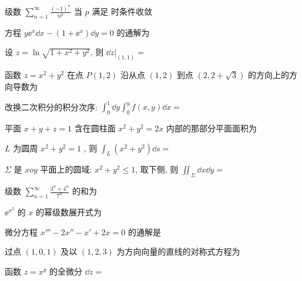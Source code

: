 \begin{ti}
	级数 $\sum_{n=1}^{\infty} \frac{(-1)^{n}}{n^{p}}$ 当 $p$ 满足 \hua{}时条件收敛
\end{ti}

\begin{ti}
	方程 $y \ee^{x} \dd{x}-\left(1+\ee^{x}\right) \dd{y}=0$ 的通解为 \hua{}
\end{ti}

\begin{ti}
	设 $z=\ln \sqrt{1+x^{2}+y^{2}}$, 则 $\dd\left.z\right|_{(1,1)}=$ \hua{}
\end{ti}

\begin{ti}
	函数 $z=x^{2}+y^{2}$ 在点 $P(1,2)$ 沿从点 $(1,2)$ 到点 $(2,2+\sqrt{3})$ 的方向上的方向导数为 \hua{}
\end{ti}

\begin{ti}
	改换二次积分的积分次序: $\int_{0}^{1} \dd{y} \int_{0}^{y} f(x, y) \dd{x}=$ \hua{}
\end{ti}

\begin{ti}
	平面 $x+y+z=1$ 含在圆柱面 $x^{2}+y^{2}=2 x$ 内部的那部分平面面积为 \hua{}
\end{ti}

\begin{ti}
	$L$ 为圆周 $x^{2}+y^{2}=1$ , 则 $\int_{L}\left(x^{2}+y^{2}\right) \dd{s}=$ \hua{}
\end{ti}

\begin{ti}
	$\Sigma$ 是 $xoy$ 平面上的圆域: $x^{2}+y^{2} \leqslant 1$, 取下侧, 则 $\iint_{\Sigma} \dd{x} \dd{y}=$ \hua{}
\end{ti}

\begin{ti}
	级数 $\sum_{n=1}^{\infty} \frac{3^{n}+4^{n}}{7^{n}}$ 的和为 \hua{}
\end{ti}

\begin{ti}
	$\ee^{x^{2}}$ 的 $x$ 的幂级数展开式为 \hua{}
\end{ti}

\begin{ti}
	微分方程 $x'''-2x''-x'+2x=0$ 的通解是 \hua{}
\end{ti}

\begin{ti}
	过点 $(1,0,1)$ 及以 $(1,2,3)$ 为方向向量的直线的对称式方程为 \hua{}
\end{ti}

\begin{ti}
	函数 $z=x^y$ 的全微分 $\dd{z}=$ \hua{}
\end{ti}

